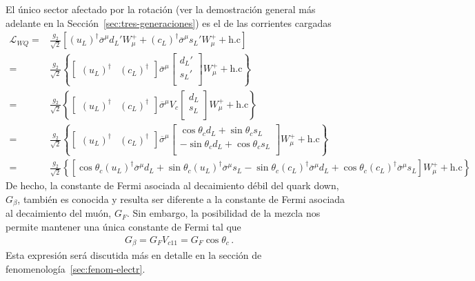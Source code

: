 \begin{frame}
El único sector afectado por la rotación (ver la demostración general más adelante en la Sección~\ref{sec:tres-generaciones}) es el de las corrientes cargadas
\begin{align}
  \mathcal{L}_{WQ}=&\frac{g_2}{\sqrt{2}}\left[(u_L)^\dagger \overline{\sigma}^\mu d_L'W_\mu^++
  (c_L)^\dagger \overline{\sigma}^\mu s_L'W_\mu^++\text{h.c}\right] \nonumber\\
=&\frac{g_2}{\sqrt{2}}\left\{
  \begin{bmatrix}
 (u_L)^\dagger &  (c_L)^\dagger
  \end{bmatrix}
 \overline{\sigma}^\mu
  \begin{bmatrix}
    d_L' \\
    s_L'\\
  \end{bmatrix}
W_\mu^++\text{h.c}\right\} \nonumber\\
=&\frac{g_2}{\sqrt{2}}\left\{
  \begin{bmatrix}
 (u_L)^\dagger &  (c_L)^\dagger
  \end{bmatrix}
 \overline{\sigma}^\mu
  V_c\begin{bmatrix}
    d_L \\
    s_L\\
  \end{bmatrix}
W_\mu^++\text{h.c}\right\}\nonumber\\
=&\frac{g_2}{\sqrt{2}}\left\{
  \begin{bmatrix}
 (u_L)^\dagger &  (c_L)^\dagger
  \end{bmatrix}
 \overline{\sigma}^\mu
  \begin{bmatrix}
    \cos\theta_c d_L+\sin\theta_c s_L\\
    -\sin\theta_c d_L+ \cos\theta_c s_L\\
  \end{bmatrix}
W_\mu^++\text{h.c}\right\} \nonumber\\
=&\frac{g_2}{\sqrt{2}}\left\{
 \left[    \cos\theta_c(u_L)^\dagger  \overline{\sigma}^\mu  d_L
   + \sin\theta_c (u_L)^\dagger  \overline{\sigma}^\mu s_L
   - \sin\theta_c (c_L)^\dagger  \overline{\sigma}^\mu d_L
   + \cos\theta_c (c_L)^\dagger \overline{\sigma}^\mu    s_L
\right]W_\mu^++\text{h.c}\right\}
\end{align}
De hecho, la constante de Fermi asociada al decaimiento débil del quark down, $G_{\beta}$, también es conocida y resulta ser diferente a la constante de Fermi asociada al decaimiento del muón, $G_F$. Sin embargo, la posibilidad de la mezcla nos permite mantener una única constante de Fermi tal que
\begin{align}
  G_\beta=G_F V_{c11}=G_F\cos\theta_c\,.
\end{align}
Esta expresión será discutida más en detalle en la sección de fenomenología~\ref{sec:fenom-electr}.


\end{frame}
